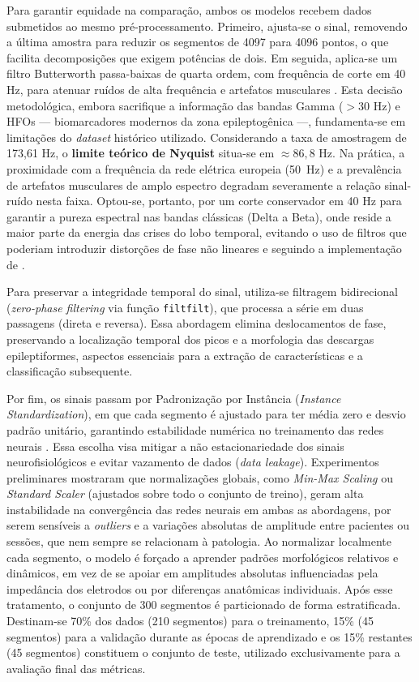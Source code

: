\documentclass[alpha-refs,brazilian]{CC-EC_TF-TC}
\begin{document}
Para garantir equidade na comparação, ambos os modelos recebem dados submetidos ao mesmo pré-processamento. Primeiro, ajusta-se o sinal, removendo a última amostra para reduzir os segmentos de 4097 para 4096 pontos, o que facilita decomposições que exigem potências de dois. Em seguida, aplica-se um filtro Butterworth passa-baixas de quarta ordem, com frequência de corte em 40 Hz, para atenuar ruídos de alta frequência e artefatos musculares \citep{Sanei2007, Subasi2019, Yogarajan2023}. Esta decisão metodológica, embora sacrifique a informação das bandas Gamma ($>30$ Hz) e HFOs — biomarcadores modernos da zona epileptogênica —, fundamenta-se em limitações do \textit{dataset} histórico utilizado. Considerando a taxa de amostragem de 173,61 Hz, o \textbf{limite teórico de Nyquist} \citep{Sanei2007} situa-se em $\approx 86,8$ Hz. Na prática, a proximidade com a frequência da rede elétrica europeia (50~Hz) e a prevalência de artefatos musculares de amplo espectro degradam severamente a relação sinal-ruído nesta faixa. Optou-se, portanto, por um corte conservador em 40 Hz para garantir a pureza espectral nas bandas clássicas (Delta a Beta), onde reside a maior parte da energia das crises do lobo temporal, evitando o uso de filtros que poderiam introduzir distorções de fase não lineares e seguindo a implementação de \cite{Yogarajan2023} \citep{Sanei2007, Islam2018}.

Para preservar a integridade temporal do sinal, utiliza-se filtragem bidirecional (\textit{zero-phase filtering} via função \texttt{filtfilt}), que processa a série em duas passagens (direta e reversa). Essa abordagem elimina deslocamentos de fase, preservando a localização temporal dos picos e a morfologia das descargas epileptiformes, aspectos essenciais para a extração de características e a classificação subsequente.

Por fim, os sinais passam por Padronização por Instância (\textit{Instance Standardization}), em que cada segmento é ajustado para ter média zero e desvio padrão unitário, garantindo estabilidade numérica no treinamento das redes neurais \citep{Islam2018, Yogarajan2023}. Essa escolha visa mitigar a não estacionariedade dos sinais neurofisiológicos e evitar vazamento de dados (\textit{data leakage}). Experimentos preliminares mostraram que normalizações globais, como \textit{Min-Max Scaling} ou \textit{Standard Scaler} (ajustados sobre todo o conjunto de treino), geram alta instabilidade na convergência das redes neurais em ambas as abordagens, por serem sensíveis a \textit{outliers} e a variações absolutas de amplitude entre pacientes ou sessões, que nem sempre se relacionam à patologia. Ao normalizar localmente cada segmento, o modelo é forçado a aprender padrões morfológicos relativos e dinâmicos, em vez de se apoiar em amplitudes absolutas influenciadas pela impedância dos eletrodos ou por diferenças anatômicas individuais. Após esse tratamento, o conjunto de 300 segmentos é particionado de forma estratificada. Destinam-se 70\% dos dados (210 segmentos) para o treinamento, 15\% (45 segmentos) para a validação durante as épocas de aprendizado e os 15\% restantes (45 segmentos) constituem o conjunto de teste, utilizado exclusivamente para a avaliação final das métricas.
\end{document}
